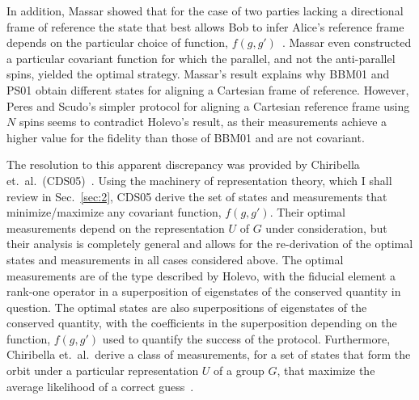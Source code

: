 In addition, Massar showed that for the case of two parties lacking a directional frame of reference the state that best allows Bob to infer Alice's reference frame depends on the particular choice of function, $f(g,g')$~\cite{M00}. Massar even constructed a particular covariant function for which the parallel, and not the anti-parallel spins, yielded the optimal strategy.  Massar's result explains why BBM01 and PS01 obtain different states for aligning a Cartesian frame of reference.  However, Peres and Scudo's simpler protocol for aligning a Cartesian reference frame using $N$ spins seems to contradict Holevo's result, as their measurements achieve a higher value for the fidelity than those of BBM01 and are not covariant.  

The resolution to this apparent discrepancy was provided by Chiribella et.~al.~(CDS05)~\cite{CDS05}.  Using the machinery of representation theory, which I shall review in Sec.~\ref{sec:2},  CDS05 derive the set of states and measurements that minimize/maximize any covariant function, $f(g,g')$.  Their optimal measurements depend on the representation $U$ of $G$ under consideration, but their analysis is completely general and allows for the re-derivation of the optimal states and measurements in all cases considered above. The optimal measurements are of the type described by Holevo, with the fiducial element a rank-one operator in a superposition of eigenstates of the conserved quantity in question. The optimal states are also superpositions of eigenstates of the conserved quantity, with the coefficients in the superposition depending on the function, $f(g,g')$ used to quantify the success of the protocol.  Furthermore, Chiribella et.~al.~derive a class of measurements, for a set of states that form the orbit under a particular representation $U$ of a group $G$, that maximize the average likelihood of a correct guess~\cite{CDPS04b}. 


